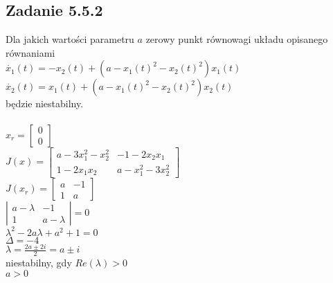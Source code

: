 \subsection*{Zadanie 5.5.2} {\color{darkgray}
	Dla jakich wartości parametru $a$ zerowy punkt równowagi układu opisanego równaniami\\
	$\dot{x_1}(t)=-x_2(t)+(a-x_1(t)^2-x_2(t)^2)x_1(t)$\\
	$\dot{x_2}(t)=x_1(t)+(a-x_1(t)^2-x_2(t)^2)x_2(t)$\\
	będzie niestabilny.
}\\\\
$x_r=\left[ \begin{array}{c}     0\\0   \end{array}\right]$\\
$J(x)=\left[ \begin{array}{cc}   a-3x_1^2-x_2^2 & -1-2x_2x_1 \\ 1-2x_1x_2 & a-x_1^2-3x_2^2    \end{array}\right]$\\
$J(x_r)=\left[ \begin{array}{cc}    a & -1 \\ 1 & a    \end{array}\right]$\\
$\left| \begin{array}{cc}     a-\lambda & -1 \\ 1 & a-\lambda   \end{array}\right|=0$\\
$\lambda^2-2a\lambda+a^2+1=0$\\
$\Delta=-4$\\
$\lambda = \frac{2a \pm 2i}{2}=a \pm i$\\
niestabilny, gdy $Re(\lambda)>0$\\
$\boxed{a>0}$\\



\pagebreak
